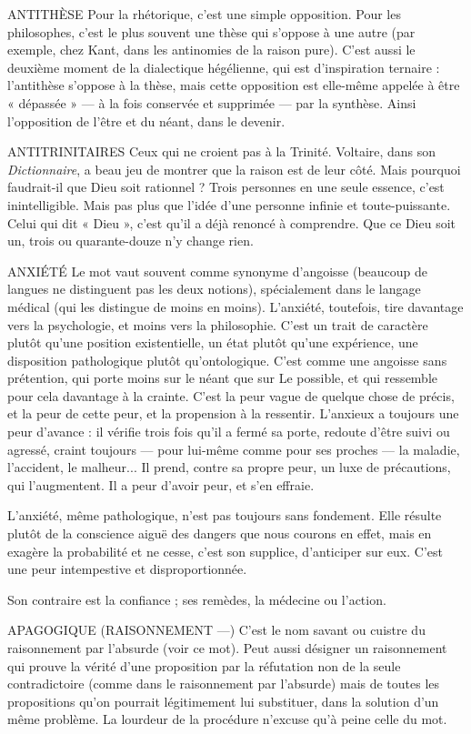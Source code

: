 ANTITHÈSE Pour la rhétorique, c’est une simple opposition. Pour les philosophes,
c’est le plus souvent une thèse qui s'oppose à une
autre (par exemple, chez Kant, dans les antinomies de la raison pure). C’est
aussi le deuxième moment de la dialectique hégélienne, qui est d'inspiration
ternaire : l’antithèse s'oppose à la thèse, mais cette opposition est elle-même
appelée à être « dépassée » — à la fois conservée et supprimée — par la synthèse.
Ainsi l’opposition de l’être et du néant, dans le devenir.

ANTITRINITAIRES Ceux qui ne croient pas à la Trinité. Voltaire, dans son
{\it Dictionnaire}, a beau jeu de montrer que la raison est de
leur côté. Mais pourquoi faudrait-il que Dieu soit rationnel ? Trois personnes
en une seule essence, c’est inintelligible. Mais pas plus que l’idée d’une personne
infinie et toute-puissante. Celui qui dit « Dieu », c’est qu’il a déjà renoncé à comprendre.
Que ce Dieu soit un, trois ou quarante-douze n’y change rien.

ANXIÉTÉ Le mot vaut souvent comme synonyme d’angoisse (beaucoup de
langues ne distinguent pas les deux notions), spécialement dans
le langage médical (qui les distingue de moins en moins). L’anxiété, toutefois,
tire davantage vers la psychologie, et moins vers la philosophie. C’est un trait
de caractère plutôt qu’une position existentielle, un état plutôt qu’une expérience,
une disposition pathologique plutôt qu’ontologique. C’est comme une
angoisse sans prétention, qui porte moins sur le néant que sur Le possible, et
qui ressemble pour cela davantage à la crainte. C’est la peur vague de quelque
chose de précis, et la peur de cette peur, et la propension à la ressentir.
L’anxieux a toujours une peur d’avance : il vérifie trois fois qu’il a fermé sa
porte, redoute d’être suivi ou agressé, craint toujours — pour lui-même
comme pour ses proches — la maladie, l’accident, le malheur... Il prend,
contre sa propre peur, un luxe de précautions, qui l’augmentent. Il a peur
d’avoir peur, et s’en effraie.

L’anxiété, même pathologique, n’est pas toujours sans fondement. Elle
résulte plutôt de la conscience aiguë des dangers que nous courons en effet,
mais en exagère la probabilité et ne cesse, c’est son supplice, d’anticiper sur eux.
C’est une peur intempestive et disproportionnée.

Son contraire est la confiance ; ses remèdes, la médecine ou l’action.

APAGOGIQUE (RAISONNEMENT —) C’est le nom savant ou cuistre du
raisonnement par l’absurde (voir ce
mot). Peut aussi désigner un raisonnement qui prouve la vérité d’une proposition
par la réfutation non de la seule contradictoire (comme dans le raisonnement
par l’absurde) mais de toutes les propositions qu’on pourrait légitimement
lui substituer, dans la solution d’un même problème. La lourdeur de la
procédure n’excuse qu’à peine celle du mot.

